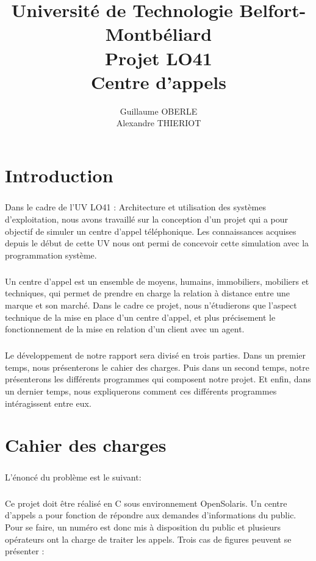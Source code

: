 \documentclass{report}
\title{Université de Technologie Belfort-Montbéliard\\
Projet LO41\\
Centre d'appels}
\author{Guillaume OBERLE\\
Alexandre THIERIOT}
\begin{document}
\maketitle

\tableofcontents

\chapter{Introduction}
	\paragraph{}
		Dans le cadre de l'UV LO41 : Architecture et utilisation des systèmes d'exploitation, nous avons travaillé sur la conception d'un projet qui a pour objectif de simuler un centre d'appel téléphonique. Les connaissances acquises depuis le début de cette UV nous ont permi de concevoir cette simulation avec la programmation système.
	\paragraph{}
		Un centre d'appel est un ensemble de moyens, humains, immobiliers, mobiliers et techniques, qui permet de prendre en charge la relation à distance entre une marque et son marché. Dans le cadre ce projet, nous n'étudierons que l'aspect technique de la mise en place d'un centre d'appel, et plus précisement le fonctionnement de la mise en relation d'un client avec un agent.
	\paragraph{}
		Le développement de notre rapport sera divisé en trois parties. Dans un premier temps, nous présenterons le cahier des charges. Puis dans un second temps, notre présenterons les différents programmes qui composent notre projet. Et enfin, dans un dernier temps, nous expliquerons comment ces différents programmes intéragissent entre eux.

\chapter{Cahier des charges}
	\paragraph{}
	L'énoncé du problème est le suivant:
	\paragraph{}
		Ce projet doit être réalisé en C sous environnement OpenSolaris. Un centre d'appels a pour fonction de répondre aux demandes d'informations du public. Pour se faire, un numéro est donc mis à disposition du public et plusieurs opérateurs ont la charge de traiter les appels. Trois cas de figures peuvent se présenter :
\end{document}
